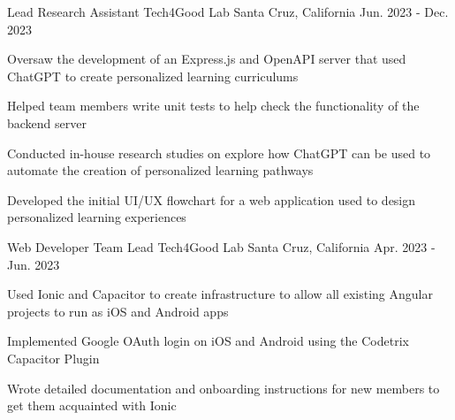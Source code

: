 

\begin{cventries}

  \cventry
    {Lead Research Assistant} %
    {Tech4Good Lab} %
    {Santa Cruz, California} %
    {Jun. 2023 - Dec. 2023} %
    {
      \begin{cvitems} %
        \item{Oversaw the development of an Express.js and OpenAPI server that used ChatGPT to create
              personalized learning curriculums}
        \item{Helped team members write unit tests to help check the functionality of the backend server}
        \item{Conducted in-house research studies on explore how ChatGPT can be used to automate the
              creation of personalized learning pathways}
        \item{Developed the initial UI/UX flowchart for a web application used to design personalized
        learning experiences}
      \end{cvitems}
    }

  \cventry
    {Web Developer Team Lead} %
    {Tech4Good Lab} %
    {Santa Cruz, California} %
    {Apr. 2023 - Jun. 2023} %
    {
      \begin{cvitems} %
        \item{Used Ionic and Capacitor to create infrastructure to allow all existing Angular projects to run as
              iOS and Android apps}
        \item{Implemented Google OAuth login on iOS and Android using the Codetrix Capacitor Plugin}
        \item{Wrote detailed documentation and onboarding instructions for new members to get them
              acquainted with Ionic}
      \end{cvitems}
  }


\end{cventries}
